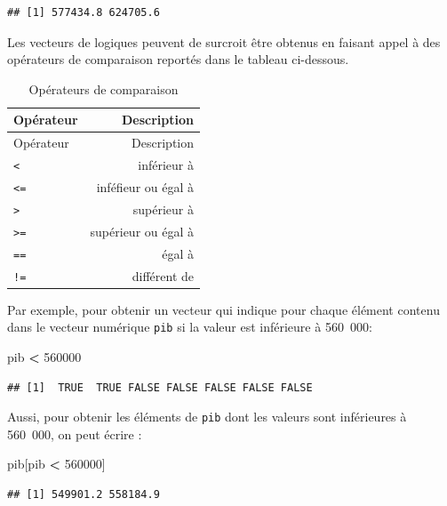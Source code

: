 \documentclass[
  11pt,
]{book}
\newenvironment{Shaded}{\begin{snugshade}}{\end{snugshade}}
\newcommand{\DecValTok}[1]{\textcolor[rgb]{0.00,0.00,0.81}{#1}}
\newcommand{\NormalTok}[1]{#1}
\newcommand{\SpecialCharTok}[1]{\textcolor[rgb]{0.81,0.36,0.00}{\textbf{#1}}}
\numberwithin{equation}{section}
\numberwithin{countremarque}{section}
\begin{document}
\begin{lstlisting}
## [1] 577434.8 624705.6
\end{lstlisting}

Les vecteurs de logiques peuvent de surcroit être obtenus en faisant appel à des opérateurs de comparaison reportés dans le tableau ci-dessous.

\begin{longtable}[]{@{}lr@{}}
\caption{\label{tab:operateurs-comparaison} Opérateurs de comparaison}\tabularnewline
\toprule\noalign{}
Opérateur & Description \\
\midrule\noalign{}
\endfirsthead
\toprule\noalign{}
Opérateur & Description \\
\midrule\noalign{}
\endhead
\bottomrule\noalign{}
\endlastfoot
\texttt{\textless{}} & inférieur à \\
\texttt{\textless{}=} & inféfieur ou égal à \\
\texttt{\textgreater{}} & supérieur à \\
\texttt{\textgreater{}=} & supérieur ou égal à \\
\texttt{==} & égal à \\
\texttt{!=} & différent de \\
\end{longtable}

Par exemple, pour obtenir un vecteur qui indique pour chaque élément contenu dans le vecteur numérique \texttt{pib} si la valeur est inférieure à 560~000:

\begin{Shaded}
\begin{Highlighting}[]
\NormalTok{pib }\SpecialCharTok{\textless{}} \DecValTok{560000}
\end{Highlighting}
\end{Shaded}

\begin{lstlisting}
## [1]  TRUE  TRUE FALSE FALSE FALSE FALSE FALSE
\end{lstlisting}

Aussi, pour obtenir les éléments de \texttt{pib} dont les valeurs sont inférieures à 560~000, on peut écrire :

\begin{Shaded}
\begin{Highlighting}[]
\NormalTok{pib[pib }\SpecialCharTok{\textless{}} \DecValTok{560000}\NormalTok{]}
\end{Highlighting}
\end{Shaded}

\begin{lstlisting}
## [1] 549901.2 558184.9
\end{lstlisting}
\end{document}
